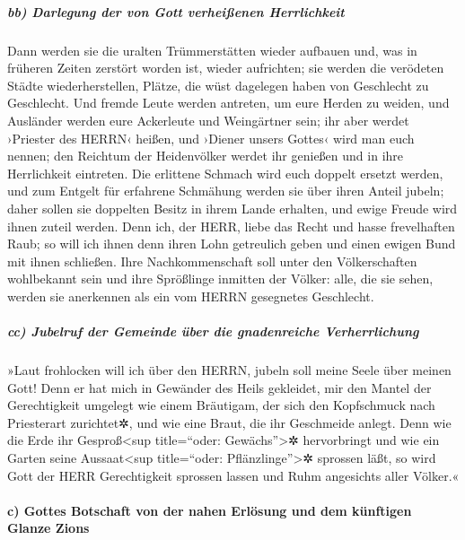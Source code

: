 \hypertarget{bb-darlegung-der-von-gott-verheiuxdfenen-herrlichkeit}{%
\subparagraph{bb) Darlegung der von Gott verheißenen
Herrlichkeit}\label{bb-darlegung-der-von-gott-verheiuxdfenen-herrlichkeit}}

Dann werden sie die uralten Trümmerstätten wieder aufbauen
und, was in früheren Zeiten zerstört worden ist, wieder aufrichten; sie
werden die verödeten Städte wiederherstellen, Plätze, die wüst dagelegen
haben von Geschlecht zu Geschlecht. Und fremde Leute
werden antreten, um eure Herden zu weiden, und Ausländer werden eure
Ackerleute und Weingärtner sein; ihr aber werdet ›Priester
des HERRN‹ heißen, und ›Diener unsers Gottes‹ wird man euch nennen; den
Reichtum der Heidenvölker werdet ihr genießen und in ihre Herrlichkeit
eintreten. Die erlittene Schmach wird euch doppelt ersetzt
werden, und zum Entgelt für erfahrene Schmähung werden sie über ihren
Anteil jubeln; daher sollen sie doppelten Besitz in ihrem Lande
erhalten, und ewige Freude wird ihnen zuteil werden. Denn
ich, der HERR, liebe das Recht und hasse frevelhaften Raub; so will ich
ihnen denn ihren Lohn getreulich geben und einen ewigen Bund mit ihnen
schließen. Ihre Nachkommenschaft soll unter den
Völkerschaften wohlbekannt sein und ihre Sprößlinge inmitten der Völker:
alle, die sie sehen, werden sie anerkennen als ein vom HERRN gesegnetes
Geschlecht.

\hypertarget{cc-jubelruf-der-gemeinde-uxfcber-die-gnadenreiche-verherrlichung}{%
\subparagraph{cc) Jubelruf der Gemeinde über die gnadenreiche
Verherrlichung}\label{cc-jubelruf-der-gemeinde-uxfcber-die-gnadenreiche-verherrlichung}}

»Laut frohlocken will ich über den HERRN, jubeln soll
meine Seele über meinen Gott! Denn er hat mich in Gewänder des Heils
gekleidet, mir den Mantel der Gerechtigkeit umgelegt wie einem
Bräutigam, der sich den Kopfschmuck nach Priesterart zurichtet✲, und wie
eine Braut, die ihr Geschmeide anlegt. Denn wie die Erde
ihr Gesproß\textless sup title=``oder: Gewächs''\textgreater✲
hervorbringt und wie ein Garten seine Aussaat\textless sup title=``oder:
Pflänzlinge''\textgreater✲ sprossen läßt, so wird Gott der HERR
Gerechtigkeit sprossen lassen und Ruhm angesichts aller Völker.«

\hypertarget{c-gottes-botschaft-von-der-nahen-erluxf6sung-und-dem-kuxfcnftigen-glanze-zions}{%
\paragraph{c) Gottes Botschaft von der nahen Erlösung und dem künftigen
Glanze
Zions}\label{c-gottes-botschaft-von-der-nahen-erluxf6sung-und-dem-kuxfcnftigen-glanze-zions}}

